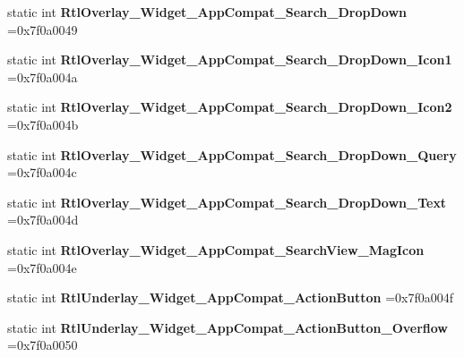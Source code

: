 \begin{DoxyCompactItemize}
static int {\bfseries Rtl\+Overlay\+\_\+\+Widget\+\_\+\+App\+Compat\+\_\+\+Search\+\_\+\+Drop\+Down} =0x7f0a0049
\item 
\mbox{\label{classandroid_1_1support_1_1design_1_1R_1_1style_a954552eac67877cf9df8e7fe4fc2f253}} 
static int {\bfseries Rtl\+Overlay\+\_\+\+Widget\+\_\+\+App\+Compat\+\_\+\+Search\+\_\+\+Drop\+Down\+\_\+\+Icon1} =0x7f0a004a
\item 
\mbox{\label{classandroid_1_1support_1_1design_1_1R_1_1style_af4069aeaeba54e285f198ee943146d7e}} 
static int {\bfseries Rtl\+Overlay\+\_\+\+Widget\+\_\+\+App\+Compat\+\_\+\+Search\+\_\+\+Drop\+Down\+\_\+\+Icon2} =0x7f0a004b
\item 
\mbox{\label{classandroid_1_1support_1_1design_1_1R_1_1style_ad49d24142dc9c8ab9e196429217ed214}} 
static int {\bfseries Rtl\+Overlay\+\_\+\+Widget\+\_\+\+App\+Compat\+\_\+\+Search\+\_\+\+Drop\+Down\+\_\+\+Query} =0x7f0a004c
\item 
\mbox{\label{classandroid_1_1support_1_1design_1_1R_1_1style_aecb351d54dbc7ebdb40a0d6efe34f8ac}} 
static int {\bfseries Rtl\+Overlay\+\_\+\+Widget\+\_\+\+App\+Compat\+\_\+\+Search\+\_\+\+Drop\+Down\+\_\+\+Text} =0x7f0a004d
\item 
\mbox{\label{classandroid_1_1support_1_1design_1_1R_1_1style_a66922c47b2b889549c2bcf89349698f9}} 
static int {\bfseries Rtl\+Overlay\+\_\+\+Widget\+\_\+\+App\+Compat\+\_\+\+Search\+View\+\_\+\+Mag\+Icon} =0x7f0a004e
\item 
\mbox{\label{classandroid_1_1support_1_1design_1_1R_1_1style_a2679640bdbd253a1a0f23f1a6094a850}} 
static int {\bfseries Rtl\+Underlay\+\_\+\+Widget\+\_\+\+App\+Compat\+\_\+\+Action\+Button} =0x7f0a004f
\item 
\mbox{\label{classandroid_1_1support_1_1design_1_1R_1_1style_afc72e4bedbb16004f780989f1182013d}} 
static int {\bfseries Rtl\+Underlay\+\_\+\+Widget\+\_\+\+App\+Compat\+\_\+\+Action\+Button\+\_\+\+Overflow} =0x7f0a0050

\end{DoxyCompactItemize}
